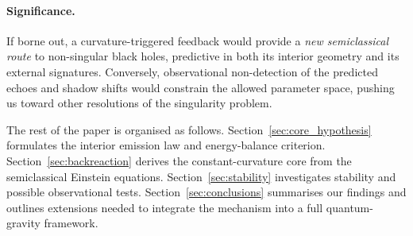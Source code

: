 \vspace{4pt}
\paragraph*{Significance.}
If borne out, a curvature-triggered feedback would provide a \emph{new semiclassical route} to non-singular black holes, predictive in both its interior geometry and its external signatures. Conversely, observational non-detection of the predicted echoes and shadow shifts would constrain the allowed parameter space, pushing us toward other resolutions of the singularity problem.

The rest of the paper is organised as follows. Section~\ref{sec:core_hypothesis} formulates the interior emission law and energy-balance criterion. Section~\ref{sec:backreaction} derives the constant-curvature core from the semiclassical Einstein equations. Section~\ref{sec:stability} investigates stability and possible observational tests. Section~\ref{sec:conclusions} summarises our findings and outlines extensions needed to integrate the mechanism into a full quantum-gravity framework.
